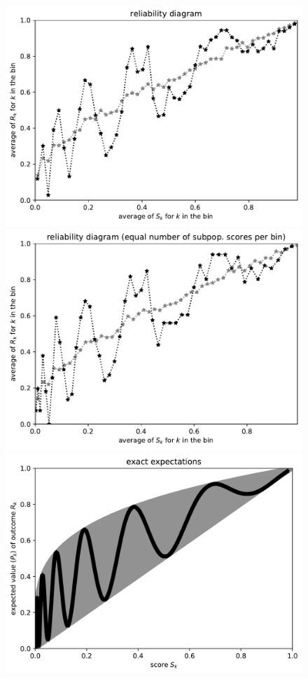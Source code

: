 \documentclass{article}
\begin{document}
\begin{figure}
\begin{centering}
\parbox{\imsize}{\includegraphics[width=\imsize]
                 {./codes/unweighted/50000_3300_50_2/equiscore.pdf}}
\quad\quad
\parbox{\imsize}{\includegraphics[width=\imsize]
                 {./codes/unweighted/50000_3300_50_2/equisamps.pdf}}

\vspace{\vertsep}

\parbox{\imsize}{\includegraphics[width=\imsize]
                 {./codes/unweighted/50000_3300_10_2/exact.jpg}}


\end{centering}
\end{figure}
\end{document}
